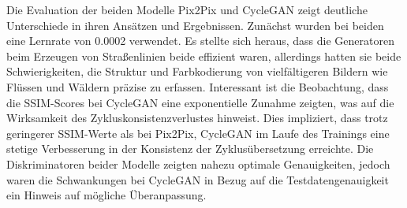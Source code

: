 Die Evaluation der beiden Modelle Pix2Pix und CycleGAN zeigt deutliche Unterschiede in ihren Ansätzen und Ergebnissen. Zunächst wurden bei beiden eine Lernrate von 0.0002 verwendet. Es stellte sich heraus, dass die Generatoren beim Erzeugen von Straßenlinien beide effizient waren, allerdings hatten sie beide Schwierigkeiten, die Struktur und Farbkodierung von vielfältigeren Bildern wie Flüssen und Wäldern präzise zu erfassen. Interessant ist die Beobachtung, dass die SSIM-Scores bei CycleGAN eine exponentielle Zunahme zeigten, was auf die Wirksamkeit des Zykluskonsistenzverlustes hinweist. Dies impliziert, dass trotz geringerer SSIM-Werte als bei Pix2Pix, CycleGAN im Laufe des Trainings eine stetige Verbesserung in der Konsistenz der Zyklusübersetzung erreichte. Die Diskriminatoren beider Modelle zeigten nahezu optimale Genauigkeiten, jedoch waren die Schwankungen bei CycleGAN in Bezug auf die Testdatengenauigkeit ein Hinweis auf mögliche Überanpassung.
